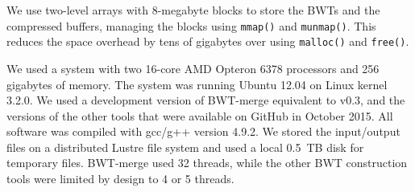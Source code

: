 \documentclass[smallabstract,smallcaptions]{dccpaper}
\newcommand{\BWT}{\textsf{BWT}}
\newcommand{\BWTmerge}{\textsf{BWT\nobreakdash-merge}}
\begin{document}
We use two-level arrays with 8\nobreakdash-megabyte blocks to store the \BWT{}s and the compressed buffers, managing the blocks using \texttt{mmap()} and \texttt{munmap()}. This reduces the space overhead by tens of gigabytes over using \texttt{malloc()} and \texttt{free()}.



We used a system with two 16\nobreakdash-core AMD Opteron 6378 processors and 256 gigabytes of memory. The system was running Ubuntu 12.04 on Linux kernel 3.2.0. We used a development version of \BWTmerge{}  equivalent to v0.3, and the versions of the other tools that were available on GitHub in October 2015. All software was compiled with gcc/g++ version 4.9.2. We stored the input/output files on a distributed Lustre file system and used a local 0.5~TB disk for temporary files. \BWTmerge{} used 32 threads, while the other \BWT{} construction tools were limited by design to 4 or 5 threads.
\end{document}
